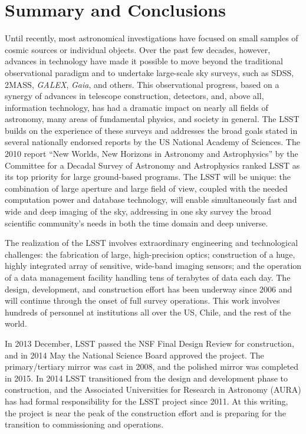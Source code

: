 \section{Summary and Conclusions}
\label{Sec:conclusions}

Until recently, most astronomical investigations have focused on small
samples of cosmic sources or individual objects. Over the past few decades,
however, advances in technology have made it possible to move beyond the
traditional observational paradigm and to undertake large-scale sky
surveys, such as SDSS, 2MASS, \textit{GALEX}, \textit{Gaia}, and others. This observational
progress, based on a synergy of advances in telescope construction, detectors,
and, above all, information technology, has had a dramatic impact on nearly all
fields of astronomy, many areas of fundamental physics, and society in
general. The LSST builds on the experience of these surveys and addresses
the broad goals stated in several nationally endorsed reports by the US
National Academy of Sciences. The 2010 report ``New Worlds, New Horizons
in Astronomy and Astrophysics'' by the Committee for a Decadal Survey of Astronomy and
Astrophysics
ranked LSST as its top priority for large ground-based programs.
The LSST will be unique: the combination of large aperture and large field of view,
coupled with the needed computation power and database technology, will
enable simultaneously fast and wide and deep imaging of the sky, addressing in
one sky survey the broad scientific community's needs in both the
time domain and deep universe.

The realization of the LSST involves extraordinary engineering and
technological challenges: the fabrication of large, high-precision optics;
construction of a huge, highly integrated array of sensitive, wide-band
imaging sensors; and the operation of a data management facility
handling tens of terabytes of data each day. The design, development,
and construction
effort has been underway since 2006 and will continue through the
onset of full survey operations.  This work involves hundreds of
personnel at institutions all over the US, Chile, and the rest of the
world.

In 2013 December, LSST passed the NSF Final Design Review for construction,
and in 2014 May the National Science Board approved the project.
The primary/tertiary mirror was cast in 2008, and the polished mirror
was completed in 2015.
In 2014 LSST transitioned from the design and development phase to
construction, and the Associated Universities for Research in
Astronomy (AURA) has had formal responsibility for the LSST project since 2011.
At this writing,  the project is near the peak of the construction
effort and is preparing for the transition to
commissioning and operations.


